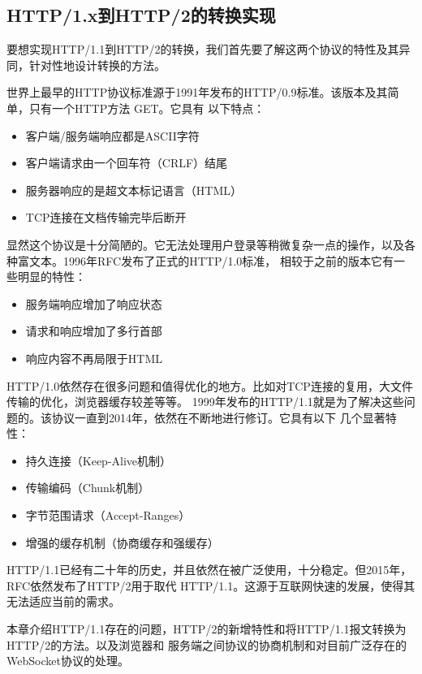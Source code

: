 \documentclass[twoside]{CUGThesis}
\begin{document}
	\begin{spacing}{2}
		\section{HTTP/1.x到HTTP/2的转换实现}
	\end{spacing}
	要想实现HTTP/1.1到HTTP/2的转换，我们首先要了解这两个协议的特性及其异同，针对性地设计转换的方法。\par
	世界上最早的HTTP协议标准源于1991年发布的HTTP/0.9标准。该版本及其简单，只有一个HTTP方法 GET。它具有
	以下特点：
	\begin{itemize}
		\item 客户端/服务端响应都是ASCII字符
		\item 客户端请求由一个回车符（CRLF）结尾
		\item 服务器响应的是超文本标记语言（HTML）
		\item TCP连接在文档传输完毕后断开
	\end{itemize}
	\par
	显然这个协议是十分简陋的。它无法处理用户登录等稍微复杂一点的操作，以及各种富文本。1996年RFC发布了正式的HTTP/1.0标准，
	相较于之前的版本它有一些明显的特性：
	\begin{itemize}
		\item 服务端响应增加了响应状态
		\item 请求和响应增加了多行首部
		\item 响应内容不再局限于HTML
	\end{itemize}
	\par
	HTTP/1.0依然存在很多问题和值得优化的地方。比如对TCP连接的复用，大文件传输的优化，浏览器缓存较差等等。
	1999年发布的HTTP/1.1就是为了解决这些问题的。该协议一直到2014年，依然在不断地进行修订。它具有以下
	几个显著特性：
	\begin{itemize}
		\item 持久连接（Keep-Alive机制）
		\item 传输编码（Chunk机制）
		\item 字节范围请求（Accept-Ranges）
		\item 增强的缓存机制（协商缓存和强缓存）
	\end{itemize}
	\par
	HTTP/1.1已经有二十年的历史，并且依然在被广泛使用，十分稳定。但2015年，RFC依然发布了HTTP/2用于取代
	HTTP/1.1。这源于互联网快速的发展，使得其无法适应当前的需求。\par 
	本章介绍HTTP/1.1存在的问题，HTTP/2的新增特性和将HTTP/1.1报文转换为HTTP/2的方法。以及浏览器和
	服务端之间协议的协商机制和对目前广泛存在的WebSocket协议的处理。
\end{document}
